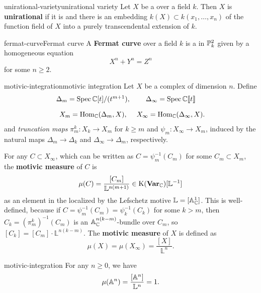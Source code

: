 \begin{topic}{unirational-variety}{unirational variety}
    Let $X$ be a  over a field $k$. Then $X$ is \textbf{unirational} if it is  and there is an embedding $k(X) \subset k(x_1, \ldots, x_n)$ of the function field of $X$ into a purely transcendental extension of $k$.
\end{topic}

\begin{topic}{fermat-curve}{Fermat curve}
    A \textbf{Fermat curve} over a field $k$ is a   in $\PP^2_k$ given by a homogeneous equation
    \[ X^n + Y^n = Z^n \]
    for some $n \ge 2$.
\end{topic}

\begin{topic}{motivic-integration}{motivic integration}
    Let $X$ be a  complex  of dimension $n$. Define
    \[ \begin{array}{cc}
        \Delta_m = \Spec \CC[t] / (t^{m + 1}), & \Delta_\infty = \Spec \CC \llbracket t \rrbracket \\[10pt]
        X_m = \Hom_\CC(\Delta_m, X), & X_\infty = \Hom_\CC(\Delta_\infty, X) .
    \end{array} \]
    and \textit{truncation maps} $\pi^k_m : X_k \to X_m$ for $k \ge m$ and $\psi_m : X_\infty \to X_m$, induced by the natural maps $\Delta_m \to \Delta_k$ and $\Delta_\infty \to \Delta_m$, respectively.
    
    For any $C \subset X_\infty$, which can be written as $C = \psi_m^{-1}(C_m)$ for some  $C_m \subset X_m$, the \textbf{motivic measure} of $C$ is
    \[ \mu(C) = \frac{[C_m]}{\mathbb{L}^{n(m + 1)}} \in \textup{K}(\textbf{Var}_\CC)[\mathbb{L}^{-1}] \]
    as an element in the  localized by the Lefschetz motive $\mathbb{L} = [\AA^1_\CC]$.
    This is well-defined, because if $C = \psi_m^{-1}(C_m) = \psi_k^{-1}(C_k)$ for some $k > m$, then $C_k = (\pi_m^k)^{-1}(C_m)$ is an $\AA_\CC^{n(k - m)}$-bundle over $C_m$, so $[C_k] = [C_m] \cdot \mathbb{L}^{n(k - m)}$.
    The \textbf{motivic measure} of $X$ is defined as
    \[ \mu(X) = \mu(X_\infty) = \frac{[X]}{\mathbb{L}^n} . \]
\end{topic}

\begin{example}{motivic-integration}
    For any $n \ge 0$, we have
    \[ \mu(\AA^n) = \frac{[\AA^n]}{\mathbb{L}^n} = 1 . \]
\end{example}

